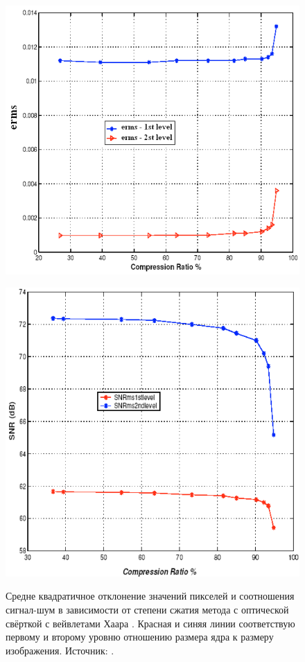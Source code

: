 \begin{figure}[htbp]
	\centering
		\begin{minipage}{.40\textwidth}
			\includegraphics[width=\linewidth]{figures/VLCERMS.png}
			\label{ris:VLCERMS}
		\end{minipage}
		\hfill
		\begin{minipage}{.40\textwidth}
			\includegraphics[width=0.95\linewidth]{figures/VLCSNR.png}
			\label{ris:VLCSNR}
		\end{minipage}
		\caption{Средне квадратичное отклонение значений пикселей и соотношения сигнал-шум в зависимости от степени сжатия метода с оптической свёрткой с вейвлетами Хаара \cite{alkholidi2008real}. Красная и синяя линии соответствую первому и второму уровню отношению размера ядра к размеру изображения. Источник: \cite{alkholidi2008real}.}
		\label{ris:VLCERMSSNR}
\end{figure}

